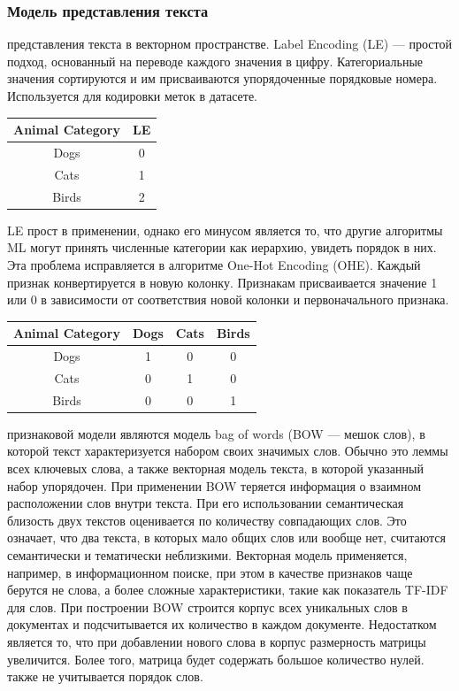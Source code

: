 \documentclass{article}
\newcommand\tab[1][1cm]{\hspace*{#1}}
\begin{document}
\subsubsection{Модель представления текста}
 представления текста в векторном пространстве. Label Encoding (LE) — простой подход, основанный на переводе каждого значения в цифру. Категориальные значения сортируются и им присваиваются упорядоченные порядковые номера. Используется для кодировки меток в датасете.\\
\begin{center}
\begin{tabular}{||c | c||} 
\hline
 Animal Category & LE \\ [0.5ex] 
 \hline\hline
 Dogs & 0 \\ 
 \hline
 Cats & 1 \\
 \hline
 Birds & 2\\ [1ex] 
 \hline
\end{tabular}
\end{center}
\tab LE прост в применении, однако его минусом является то, что другие алгоритмы ML могут принять численные категории как иерархию, увидеть порядок в них. Эта проблема исправляется в алгоритме One-Hot Encoding (OHE). Каждый признак конвертируется в новую колонку. Признакам присваивается значение 1 или 0 в зависимости от соответствия новой колонки и первоначального признака.\\
\begin{center}
\begin{tabular}{||c | c | c | c||} 
\hline
 Animal Category &  Dogs &  Cats & Birds\\ [0.5ex] 
 \hline\hline
 Dogs & 1 & 0 & 0 \\ 
 \hline
 Cats & 0 & 1 & 0 \\
 \hline
 Birds & 0 & 0 & 1\\ [1ex] 
 \hline
\end{tabular}
\end{center} 
 признаковой модели являются модель bag of words (BOW — мешок слов), в которой текст характеризуется набором своих значимых слов. Обычно это леммы всех ключевых слова, а также векторная модель текста, в которой указанный набор упорядочен. При применении BOW теряется информация о взаимном расположении слов внутри текста. При его использовании семантическая близость двух текстов оценивается по количеству совпадающих слов. Это означает, что два текста, в которых мало общих слов или вообще нет, считаются семантически и тематически неблизкими. Векторная модель применяется, например, в информационном поиске, при этом в качестве признаков чаще берутся не слова, а более сложные характеристики, такие как показатель TF-IDF для слов. При построении BOW строится корпус всех уникальных слов в документах и подсчитывается их количество в каждом документе. Недостатком является то, что при добавлении нового слова в корпус размерность матрицы увеличится. Более того, матрица будет содержать большое количество нулей. также не учитывается порядок слов.\\
\end{document}
